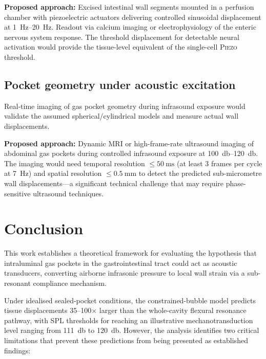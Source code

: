 \documentclass[12pt]{article}
\newcommand{\piezo}{\textsc{Piezo}}
\begin{document}
\textbf{Proposed approach:} Excised intestinal wall segments mounted in a
perfusion chamber with piezoelectric actuators delivering controlled
sinusoidal displacement at \SIrange{1}{20}{\hertz}.  Readout via
calcium imaging or electrophysiology of the enteric nervous system
response.  The threshold displacement for detectable neural activation
would provide the tissue-level equivalent of the single-cell
\piezo{} threshold.

\subsection{Pocket geometry under acoustic excitation}
\label{sec:exp_geometry}

Real-time imaging of gas pocket geometry during infrasound exposure would
validate the assumed spherical/cylindrical models and measure actual wall
displacements.

\textbf{Proposed approach:} Dynamic MRI or high-frame-rate ultrasound
imaging of abdominal gas pockets during controlled infrasound exposure at
\SIrange{100}{120}{\decibel}.  The imaging would need temporal resolution
$\leq \SI{50}{\milli\second}$ (at least 3 frames per cycle at
\SI{7}{\hertz}) and spatial resolution $\leq \SI{0.5}{\milli\metre}$ to
detect the predicted sub-micrometre wall displacements---a significant
technical challenge that may require phase-sensitive ultrasound techniques.


\section{Conclusion}
\label{sec:conclusion}

This work establishes a theoretical framework for evaluating the hypothesis
that intraluminal gas pockets in the gastrointestinal tract could act as
acoustic transducers, converting airborne infrasonic pressure to local wall
strain via a sub-resonant compliance mechanism.

Under idealised sealed-pocket conditions, the constrained-bubble model
predicts tissue displacements 35--100$\times$ larger than the whole-cavity
flexural resonance pathway, with SPL thresholds for reaching an illustrative
mechanotransduction level ranging from \SI{111}{\decibel} to
\SI{120}{\decibel}.  However, the analysis identifies two critical
limitations that prevent these predictions from being presented as
established findings:
\end{document}

